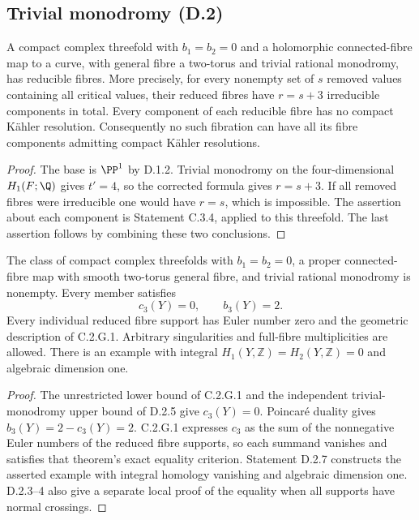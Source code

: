 \subsection{Trivial monodromy (D.2)}

\begin{proposition}\label{st:D.2.1}
A compact complex threefold with $b_1=b_2=0$ and a holomorphic
connected-fibre map to a curve, with general fibre a two-torus and
trivial rational monodromy, has reducible fibres. More precisely,
for every nonempty set of $s$ removed values containing all critical
values, their reduced fibres have $r=s+3$ irreducible components in
total. Every component of each reducible fibre has no compact
K\"ahler resolution. Consequently no such fibration can have all
its fibre components admitting compact K\"ahler resolutions.
\end{proposition}
\begin{proof}
The base is $\PP^1$ by D.1.2. Trivial monodromy on the
four-dimensional $H_1(F;\Q)$ gives $t'=4$, so the corrected formula
gives $r=s+3$. If all removed fibres were irreducible one would have
$r=s$, which is impossible. The assertion about each component is
Statement C.3.4, applied to this threefold. The last assertion follows
by combining these two conclusions.
\end{proof}

\begin{theorem}\label{st:D.2.2}
The class of compact complex threefolds with $b_1=b_2=0$,
a proper connected-fibre map with smooth two-torus general fibre,
and trivial rational monodromy is nonempty. Every member satisfies
\[
                   c_3(Y)=0,\qquad b_3(Y)=2.
\]
Every individual reduced fibre support has Euler number zero and
the geometric description of C.2.G.1. Arbitrary singularities and
full-fibre multiplicities are allowed. There is an example with
integral $H_1(Y,\mathbb Z)=H_2(Y,\mathbb Z)=0$ and
algebraic dimension one.
\end{theorem}
\begin{proof}
The unrestricted lower bound of C.2.G.1 and the independent
trivial-monodromy upper bound of D.2.5 give $c_3(Y)=0$.
Poincar\'e duality gives $b_3(Y)=2-c_3(Y)=2$.
C.2.G.1 expresses $c_3$ as the sum of the nonnegative
Euler numbers of the reduced fibre supports, so each summand
vanishes and satisfies that theorem's exact equality criterion.
Statement D.2.7 constructs the asserted example with integral
homology vanishing and algebraic dimension one. D.2.3--4 also
give a separate local proof of the equality when all supports
have normal crossings.
\end{proof}

